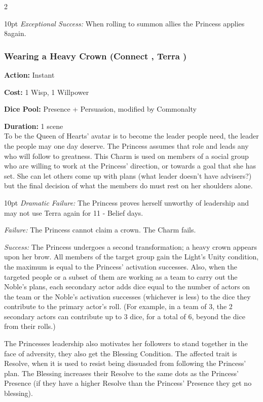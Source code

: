 \begin{multicols}{2}
\begin{myindentpar}{10pt}
    \emph{Exceptional Success:} When rolling to summon allies the Princess applies 8again. \end{myindentpar}

\subsubsection*{Wearing a Heavy Crown (Connect \textbullet\textbullet\textbullet\textbullet\textbullet, Terra \textbullet\textbullet\textbullet\textbullet)}

\noindent \textbf{Action:} Instant

\noindent \textbf{Cost:} 1 Wisp, 1 Willpower

\noindent \textbf{Dice Pool:} Presence + Persuasion, modified by Commonalty

\noindent \textbf{Duration:} 1 scene \\

\noindent To be the Queen of Hearts' avatar is to become the leader people need, the leader the people may one day deserve. The Princess assumes that role and leads any who will follow to greatness. This Charm is used on members of a social group who are willing to work at the Princess' direction, or towards a goal that she has set. She can let others come up with plans (what leader doesn’t have advisers?) but the final decision of what the members do must rest on her shoulders alone.

\begin{myindentpar}{10pt}    \emph{Dramatic Failure:} The Princess proves herself unworthy of leadership and may not use Terra again for 11 - Belief days. 

    \emph{Failure:} The Princess cannot claim a crown. The Charm fails.

    \emph{Success:} The Princess undergoes a second transformation; a heavy crown appears upon her brow. All members of the target group gain the Light's Unity condition, the maximum is equal to the Princess' activation successes. Also, when the targeted people or a subset of them are working as a team to carry out the Noble’s plans, each secondary actor adds dice equal to the number of actors on the team or the Noble’s activation successes (whichever is less) to the dice they contribute to the primary actor’s roll. (For example, in a team of 3, the 2 secondary actors can contribute up to 3 dice, for a total of 6, beyond the dice from their rolls.)
    
    The Princesses leadership also motivates her followers to stand together in the face of adversity, they also get the Blessing Condition. The affected trait is Resolve, when it is used to resist being dissuaded from following the Princess' plan. The Blessing increases their Resolve to the same dots as the Princess' Presence (if they have a higher Resolve than the Princess' Presence they get no blessing). 


\end{myindentpar}
\end{multicols}
